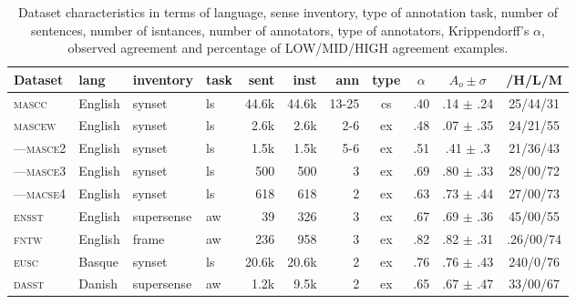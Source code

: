 \documentclass[11pt,a4paper]{article}
\begin{document}
\begin{table}[Ht!]

\begin{center}
  \begin{tabular}{llllrrrcccc}
  \toprule 

Dataset& lang & inventory & task & sent & inst & ann & type & $\alpha$ & $A_o\pm\sigma$ & /H/L/M\\ 
\midrule 

\textsc{mascc} & English & synset & ls & 44.6k & 44.6k & 13-25 & cs & .40 & .14 $\pm$ .24 & 25/44/31\\
\textsc{mascew} & English & synset & ls & 2.6k & 2.6k & 2-6 & ex & .48 & .07 $\pm$ .35 & 24/21/55\\
---\textsc{masce2} & English & synset & ls & 1.5k & 1.5k & 5-6 & ex & .51 & .41 $\pm$ .3 & 21/36/43\\
---\textsc{masce3} & English & synset & ls & 500 & 500 & 3 & ex & .69 & .80 $\pm$ .33 & 28/00/72\\
---\textsc{macse4} & English & synset & ls & 618 & 618 & 2 & ex & .63 & .73 $\pm$ .44 & 27/00/73\\
\textsc{ensst} & English & supersense & aw & 39 & 326 & 3 & ex & .67 & .69 $\pm$ .36 & 45/00/55\\
\textsc{fntw} & English & frame & aw & 236 & 958 & 3 & ex & .82 & .82 $\pm$ .31 & .26/00/74\\

\textsc{eusc} & Basque & synset & ls & 20.6k & 20.6k & 2 & ex & .76 & .76 $\pm$ .43 & 240/0/76\\
\textsc{dasst} & Danish & supersense & aw & 1.2k & 9.5k & 2 & ex & .65 & .67 $\pm$ .47 & 33/00/67\\


\bottomrule

  \end{tabular}  
\end{center}
\caption{Dataset characteristics \label{tab:data} in terms of language, sense inventory, type of annotation task, number of sentences, number of isntances, number of annotators, type of annotators, Krippendorff's $\alpha$, observed agreement and percentage of LOW/MID/HIGH agreement examples.}
\end{table} 
\end{document}
